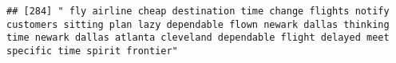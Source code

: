 \documentclass[
]{article}
\begin{document}
\begin{verbatim}
## [284] " fly airline cheap destination time change flights notify customers sitting plan lazy dependable flown newark dallas thinking time newark dallas atlanta cleveland dependable flight delayed meet specific time spirit frontier"                                                                                                                                                                                                                                                                                                                                                                                                                                                                                                                                                                                                                                                                                                                                                                                                                                                                                                                                                                                                                                                                                                                                                                                                                                                                                                                                                                                                                                                                                                                                                               

\end{verbatim}
\end{document}
